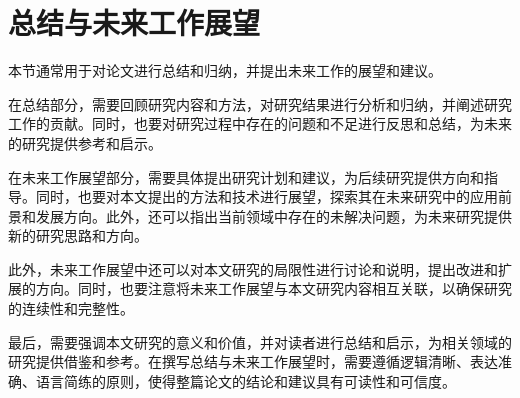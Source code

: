 \section{总结与未来工作展望}\label{sec:conclusion}

本节通常用于对论文进行总结和归纳，并提出未来工作的展望和建议。

在总结部分，需要回顾研究内容和方法，对研究结果进行分析和归纳，并阐述研究工作的贡献。同时，也要对研究过程中存在的问题和不足进行反思和总结，为未来的研究提供参考和启示。

在未来工作展望部分，需要具体提出研究计划和建议，为后续研究提供方向和指导。同时，也要对本文提出的方法和技术进行展望，探索其在未来研究中的应用前景和发展方向。此外，还可以指出当前领域中存在的未解决问题，为未来研究提供新的研究思路和方向。

此外，未来工作展望中还可以对本文研究的局限性进行讨论和说明，提出改进和扩展的方向。同时，也要注意将未来工作展望与本文研究内容相互关联，以确保研究的连续性和完整性。

最后，需要强调本文研究的意义和价值，并对读者进行总结和启示，为相关领域的研究提供借鉴和参考。在撰写总结与未来工作展望时，需要遵循逻辑清晰、表达准确、语言简练的原则，使得整篇论文的结论和建议具有可读性和可信度。
